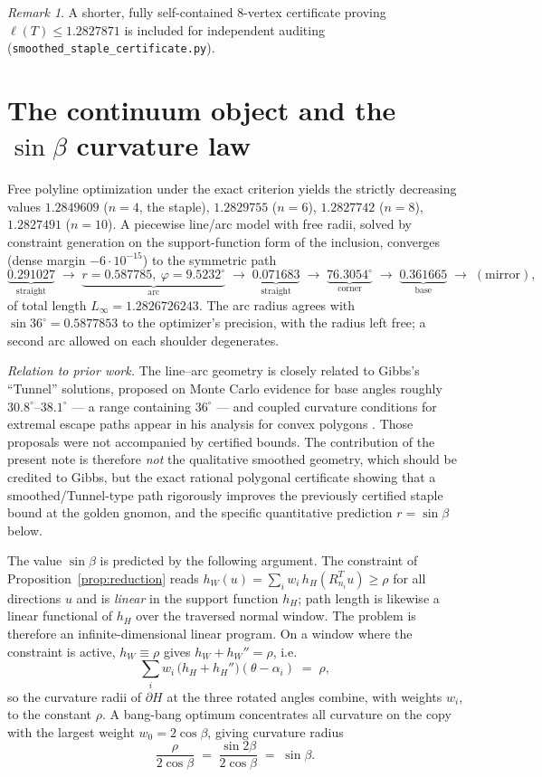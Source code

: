 \documentclass[11pt]{amsart}
\theoremstyle{remark}
\newtheorem{remark}[theorem]{Remark}
\begin{document}
\begin{remark}
A shorter, fully self-contained $8$-vertex certificate proving
$\ell(T)\le1.2827871$ is included for independent auditing
(\texttt{smoothed\_staple\_certificate.py}).
\end{remark}

\section{The continuum object and the $\sin\beta$ curvature law}
Free polyline optimization under the exact criterion yields the strictly
decreasing values $1.2849609$ ($n=4$, the staple), $1.2829755$ ($n=6$),
$1.2827742$ ($n=8$), $1.2827491$ ($n=10$). A piecewise line/arc model with
free radii, solved by constraint generation on the support-function form of
the inclusion, converges (dense margin $-6\cdot10^{-15}$) to the symmetric
path
\[
  \underbrace{0.291027}_{\text{straight}}
  \;\to\;\underbrace{r=0.587785,\ \varphi=9.5232^\circ}_{\text{arc}}
  \;\to\;\underbrace{0.071683}_{\text{straight}}
  \;\to\;\underbrace{76.3054^\circ}_{\text{corner}}
  \;\to\;\underbrace{0.361665}_{\text{base}}\;\to\;(\text{mirror}),
\]
of total length $L_\infty=1.2826726243$. The arc radius agrees with
$\sin36^\circ=0.5877853$ to the optimizer's precision, with the radius left
free; a second arc allowed on each shoulder degenerates.

\emph{Relation to prior work.} The line--arc geometry is closely related to
Gibbs's ``Tunnel'' solutions, proposed on Monte Carlo evidence for base
angles roughly $30.8^\circ$--$38.1^\circ$ \cite{Gib16a} --- a range
containing $36^\circ$ --- and coupled curvature conditions for extremal
escape paths appear in his analysis for convex polygons \cite{Gib16b}.
Those proposals were not accompanied by certified bounds. The contribution
of the present note is therefore \emph{not} the qualitative smoothed
geometry, which should be credited to Gibbs, but the exact rational
polygonal certificate showing that a smoothed/Tunnel-type path rigorously
improves the previously certified staple bound at the golden gnomon, and
the specific quantitative prediction $r=\sin\beta$ below.

The value $\sin\beta$ is predicted by the following argument. The
constraint of Proposition~\ref{prop:reduction} reads
$h_W(u)=\sum_i w_i\,h_H(R_{n_i}^{T}u)\ge\rho$ for all directions $u$ and is
\emph{linear} in the support function $h_H$; path length is likewise a
linear functional of $h_H$ over the traversed normal window. The problem is
therefore an infinite-dimensional linear program. On a window where the
constraint is active, $h_W\equiv\rho$ gives $h_W+h_W''=\rho$, i.e.
\[
  \sum_i w_i\,\bigl(h_H+h_H''\bigr)(\theta-\alpha_i)\;=\;\rho ,
\]
so the curvature radii of $\partial H$ at the three rotated angles combine,
with weights $w_i$, to the constant $\rho$. A bang-bang optimum concentrates
all curvature on the copy with the largest weight $w_0=2\cos\beta$, giving
curvature radius
\[
  \frac{\rho}{2\cos\beta}\;=\;\frac{\sin2\beta}{2\cos\beta}\;=\;\sin\beta .
\]
\end{document}
